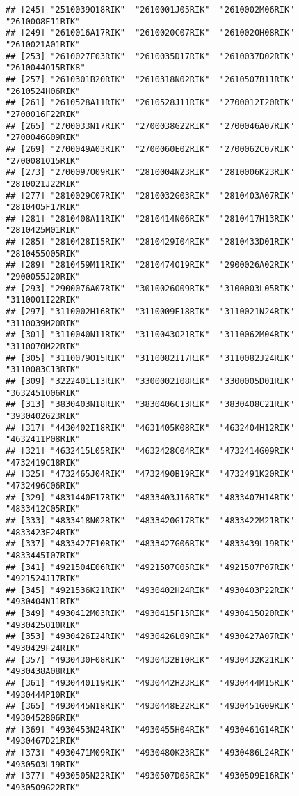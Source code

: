 \documentclass[
]{article}
\begin{document}
\begin{verbatim}
## [245] "2510039O18RIK"  "2610001J05RIK"  "2610002M06RIK"  "2610008E11RIK" 
## [249] "2610016A17RIK"  "2610020C07RIK"  "2610020H08RIK"  "2610021A01RIK" 
## [253] "2610027F03RIK"  "2610035D17RIK"  "2610037D02RIK"  "2610044O15RIK8"
## [257] "2610301B20RIK"  "2610318N02RIK"  "2610507B11RIK"  "2610524H06RIK" 
## [261] "2610528A11RIK"  "2610528J11RIK"  "2700012I20RIK"  "2700016F22RIK" 
## [265] "2700033N17RIK"  "2700038G22RIK"  "2700046A07RIK"  "2700046G09RIK" 
## [269] "2700049A03RIK"  "2700060E02RIK"  "2700062C07RIK"  "2700081O15RIK" 
## [273] "2700097O09RIK"  "2810004N23RIK"  "2810006K23RIK"  "2810021J22RIK" 
## [277] "2810029C07RIK"  "2810032G03RIK"  "2810403A07RIK"  "2810405F17RIK" 
## [281] "2810408A11RIK"  "2810414N06RIK"  "2810417H13RIK"  "2810425M01RIK" 
## [285] "2810428I15RIK"  "2810429I04RIK"  "2810433D01RIK"  "2810455O05RIK" 
## [289] "2810459M11RIK"  "2810474O19RIK"  "2900026A02RIK"  "2900055J20RIK" 
## [293] "2900076A07RIK"  "3010026O09RIK"  "3100003L05RIK"  "3110001I22RIK" 
## [297] "3110002H16RIK"  "3110009E18RIK"  "3110021N24RIK"  "3110039M20RIK" 
## [301] "3110040N11RIK"  "3110043O21RIK"  "3110062M04RIK"  "3110070M22RIK" 
## [305] "3110079O15RIK"  "3110082I17RIK"  "3110082J24RIK"  "3110083C13RIK" 
## [309] "3222401L13RIK"  "3300002I08RIK"  "3300005D01RIK"  "3632451O06RIK" 
## [313] "3830403N18RIK"  "3830406C13RIK"  "3830408C21RIK"  "3930402G23RIK" 
## [317] "4430402I18RIK"  "4631405K08RIK"  "4632404H12RIK"  "4632411P08RIK" 
## [321] "4632415L05RIK"  "4632428C04RIK"  "4732414G09RIK"  "4732419C18RIK" 
## [325] "4732465J04RIK"  "4732490B19RIK"  "4732491K20RIK"  "4732496C06RIK" 
## [329] "4831440E17RIK"  "4833403J16RIK"  "4833407H14RIK"  "4833412C05RIK" 
## [333] "4833418N02RIK"  "4833420G17RIK"  "4833422M21RIK"  "4833423E24RIK" 
## [337] "4833427F10RIK"  "4833427G06RIK"  "4833439L19RIK"  "4833445I07RIK" 
## [341] "4921504E06RIK"  "4921507G05RIK"  "4921507P07RIK"  "4921524J17RIK" 
## [345] "4921536K21RIK"  "4930402H24RIK"  "4930403P22RIK"  "4930404N11RIK" 
## [349] "4930412M03RIK"  "4930415F15RIK"  "4930415O20RIK"  "4930425O10RIK" 
## [353] "4930426I24RIK"  "4930426L09RIK"  "4930427A07RIK"  "4930429F24RIK" 
## [357] "4930430F08RIK"  "4930432B10RIK"  "4930432K21RIK"  "4930438A08RIK" 
## [361] "4930440I19RIK"  "4930442H23RIK"  "4930444M15RIK"  "4930444P10RIK" 
## [365] "4930445N18RIK"  "4930448E22RIK"  "4930451G09RIK"  "4930452B06RIK" 
## [369] "4930453N24RIK"  "4930455H04RIK"  "4930461G14RIK"  "4930467D21RIK" 
## [373] "4930471M09RIK"  "4930480K23RIK"  "4930486L24RIK"  "4930503L19RIK" 
## [377] "4930505N22RIK"  "4930507D05RIK"  "4930509E16RIK"  "4930509G22RIK" 

\end{verbatim}
\end{document}
